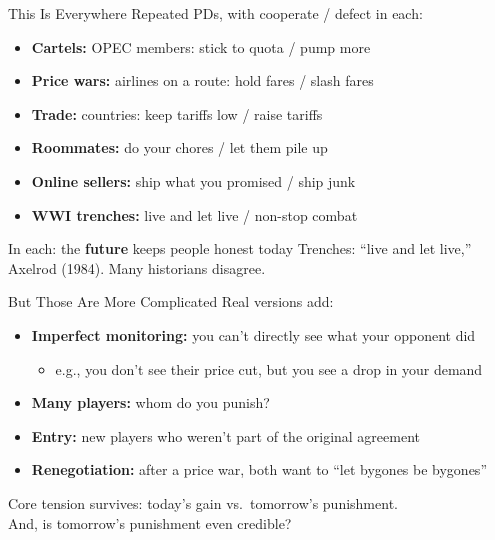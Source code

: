\begin{frame}{This Is Everywhere}
Repeated PDs, with cooperate / defect in each:
\begin{itemize}
    \item \textbf{Cartels:} OPEC members: stick to quota / pump more
    \item \textbf{Price wars:} airlines on a route: hold fares / slash fares
    \item \textbf{Trade:} countries: keep tariffs low / raise tariffs
    \item \textbf{Roommates:} do your chores / let them pile up
    \item \textbf{Online sellers:} ship what you promised / ship junk
    \item \textbf{WWI trenches:} live and let live / non-stop combat
\end{itemize}
\bsk
In each: the \textbf{future} keeps people honest today
\vfill
{\footnotesize Trenches: ``live and let live,'' Axelrod (1984). Many historians disagree.}
\vspace{-0.2in}
\end{frame}

\begin{frame}{But Those Are More Complicated}
Real versions add:
\begin{itemize}
    \item \textbf{Imperfect monitoring:} you can't directly see what your opponent did
    \begin{itemize}
        \item e.g., you don't see their price cut, but you see a drop in your demand
    \end{itemize}
    \item \textbf{Many players:} whom do you punish?
    \item \textbf{Entry:} new players who weren't part of the original agreement
    \item \textbf{Renegotiation:} after a price war, both want to ``let bygones be bygones''
\end{itemize}
\bsk
Core tension survives: today's gain vs.\ tomorrow's punishment.\\
And, is tomorrow's punishment even credible?
\vspace{-0.3in}
\end{frame}


